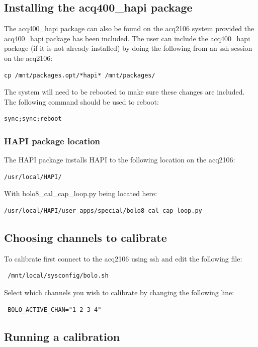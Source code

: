 \documentclass{article}
\begin{document}
\subsection{Installing the acq400\_hapi package}
The acq400\_hapi package can also be found on the acq2106 system provided the acq400\_hapi package has been included.
The user can include the acq400\_hapi package (if it is not already installed) by doing the following from an ssh session on the acq2106:
\begin{verbatim}cp /mnt/packages.opt/*hapi* /mnt/packages/\end{verbatim}
The system will need to be rebooted to make sure these changes are included.
The following command should be used to reboot:
\begin{verbatim}sync;sync;reboot\end{verbatim}
\subsubsection{HAPI package location}
The HAPI package installs HAPI to the following location on the acq2106:

\begin{verbatim}
/usr/local/HAPI/
\end{verbatim}

With bolo8\_cal\_cap\_loop.py being located here:

\begin{verbatim}
/usr/local/HAPI/user_apps/special/bolo8_cal_cap_loop.py
\end{verbatim}

\subsection{Choosing channels to calibrate}

To calibrate first connect to the acq2106 using ssh and edit the following file:

\begin{verbatim} /mnt/local/sysconfig/bolo.sh \end{verbatim}

Select which channels you wish to calibrate by changing the following line:

\begin{verbatim} BOLO_ACTIVE_CHAN="1 2 3 4" \end{verbatim}

\subsection{Running a calibration}
\end{document}
